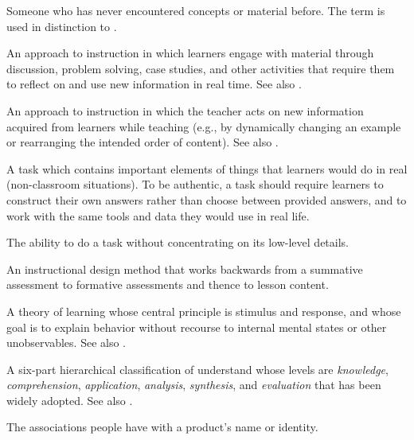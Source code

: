 
\begin{description}

 Someone who has never
encountered concepts or material before. The term is used in distinction to
.

 An approach to instruction in which
learners engage with material through discussion, problem solving, case studies,
and other activities that require them to reflect on and use new information in
real time.  See also .

 An approach to instruction in which the
teacher acts on new information acquired from learners while teaching (e.g.,
by dynamically changing an example or rearranging the intended order of
content).  See also .

 A task which contains important
elements of things that learners would do in real (non-classroom situations). To
be authentic, a task should require learners to construct their own answers
rather than choose between provided answers, and to work with the same tools and
data they would use in real life.

 The ability to do a task without
concentrating on its low-level details.

 An instructional design method that
works backwards from a summative assessment to formative assessments and thence
to lesson content.

 A theory of learning whose central principle
is stimulus and response, and whose goal is to explain behavior without recourse
to internal mental states or other unobservables. See
also .

 A six-part hierarchical
classification of understand whose levels are \emph{knowledge},
\emph{comprehension}, \emph{application}, \emph{analysis}, \emph{synthesis}, and
\emph{evaluation} that has been widely adopted. See also
.

 The associations people have with a product's name or
identity.


\end{description}
